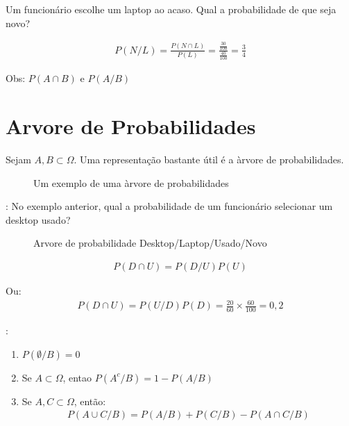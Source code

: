 \begin{description}
\begin{description}
        Um funcionário escolhe um laptop ao acaso. Qual a probabilidade de que seja novo?

      \item[Resolucão:]


        \begin{align*}
          P(N/L)= \frac{P(N \cap L)}{P(L)}= \frac{\frac{30}{100}}{\frac{40}{100}}=\frac{3}{4}
        \end{align*}

        Obs: $P(A \cap B)$ e $P(A/B)$
    \end{description}
    \section{Arvore de Probabilidades}
    
    Sejam $A,B \subset \Omega$. Uma representação bastante útil é a àrvore de probabilidades.
    \begin{description}
      \begin{figure}[H]
        \centering
        
        \label{fig:17}
        \caption{Um exemplo de uma àrvore de probabilidades}
      \end{figure}

    \item[Exemplo]: No exemplo anterior, qual a probabilidade de um funcionário selecionar um 
      desktop usado?
      \begin{figure}[H]
        \centering
        
        \caption{Arvore de probabilidade Desktop/Laptop/Usado/Novo }
        \label{fig:18}
      \end{figure}
      \begin{align*}
        P(D \cap U)= P(D/U)P(U)
      \end{align*}

      Ou:
      \begin{align*}
        P(D \cap U)= P(U/D)P(D)= \frac{20}{60}\times \frac{60}{100}= 0,2
      \end{align*}

    \item [Algumas propriedades]:
      \begin{enumerate}[label=(\alph*)]
        \item $P(\emptyset / B)=0$
        \item Se $A \subset \Omega$, entao $P(A^c / B)= 1-P(A/B)$
        \item Se $A,C \subset \Omega$, então:
          \begin{align}
            P(A \cup C / B)= P(A/B)+ P(C/B) - P(A \cap C/B)
          \end{align}
      \end{enumerate}


\end{description}
\end{description}
